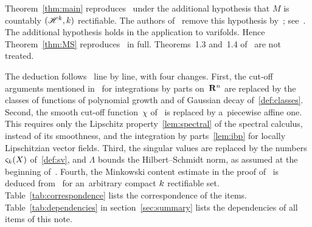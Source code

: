 \documentclass[a4paper,twoside,leqno]{article}
\newcommand{\sv}[1]{\varsigma_{#1}}        %
\begin{document}
Theorem~\ref{thm:main} reproduces~\cite[Theorem~1.1]{DePhilippisGennaioliPigatiRindler2026} under
the additional hypothesis that $M$ is countably $(\mathscr{H}^{k},k)$ rectifiable. The authors
of~\cite{DePhilippisGennaioliPigatiRindler2026} remove this hypothesis
by~\cite[Proposition~3.1]{ArroyoRabasa2019}; see~\cite[Remark~1.2 and the proof of
Theorem~1.1]{DePhilippisGennaioliPigatiRindler2026}. The additional hypothesis holds in the
application to varifolds. Hence Theorem~\ref{thm:MS}
reproduces~\cite[Theorem~1.6]{DePhilippisGennaioliPigatiRindler2026} in full. Theorems~1.3
and~1.4 of~\cite{DePhilippisGennaioliPigatiRindler2026} are not treated.

The deduction follows~\cite{DePhilippisGennaioliPigatiRindler2026} line by line, with four
changes. First, the cut-off arguments mentioned
in~\cite{DePhilippisGennaioliPigatiRindler2026} for integrations by parts on~$\mathbf{R}^{n}$ are
replaced by the classes of functions of polynomial growth and of Gaussian decay
of~\ref{def:classes}. Second, the smooth cut-off function~$\chi$ of~\cite[proof of
Lemma~3.2]{DePhilippisGennaioliPigatiRindler2026} is replaced by a~piecewise affine one. This
requires only the Lipschitz property~\ref{lem:spectral} of the spectral calculus, instead of its
smoothness, and the integration by parts~\ref{lem:ibp} for locally Lipschitzian vector fields.
Third, the singular values are replaced by the numbers $\sv{\vdim}(X)$ of~\ref{def:sv}, and
$\Lambda$ bounds the Hilbert--Schmidt norm, as assumed at the beginning of~\cite[section~3]
{DePhilippisGennaioliPigatiRindler2026}. Fourth, the Minkowski content estimate in the proof
of~\cite[(4.2)]{DePhilippisGennaioliPigatiRindler2026} is deduced from~\cite[3.2.39]{Federer1969}
for an~arbitrary compact $k$ rectifiable set. Table~\ref{tab:correspondence} lists the
correspondence of the items. Table~\ref{tab:dependencies} in section~\ref{sec:summary} lists the
dependencies of all items of this note.
\end{document}
